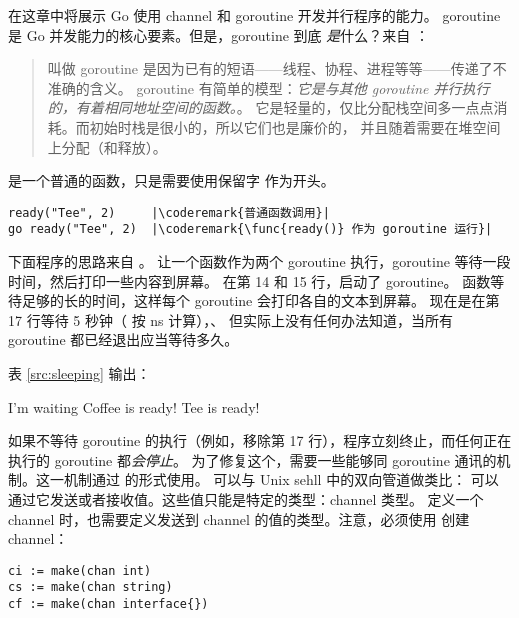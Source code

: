 \noindent{}在这章中将展示 Go 使用 channel 和 goroutine 开发并行程序的能力。
goroutine 是 Go 并发能力的核心要素。但是，goroutine 到底 \emph{是}什么？来自
\cite{effective_go}：
\begin{quote}
叫做 goroutine 是因为已有的短语——线程、协程、进程等等——传递了不准确的含义。
goroutine 有简单的模型：\emph{它是与其他 goroutine 并行执行的，有着相同地址空间的函数。}。
它是轻量的，仅比分配栈空间多一点点消耗。而初始时栈是很小的，所以它们也是廉价的，
并且随着需要在堆空间上分配（和释放）。
\end{quote}
 是一个普通的函数，只是需要使用保留字
 作为开头。
\begin{lstlisting}
ready("Tee", 2)	    |\coderemark{普通函数调用}|
go ready("Tee", 2)  |\coderemark{\func{ready()} 作为 goroutine 运行}|
\end{lstlisting}
下面程序的思路来自 \cite{go_course_day3}。
让一个函数作为两个 goroutine 执行，goroutine 等待一段时间，然后打印一些内容到屏幕。
在第 14 和 15 行，启动了 goroutine。
 函数等待足够的长的时间，这样每个 goroutine 会打印各自的文本到屏幕。
现在是在第 17 行等待 5 秒钟（ 按 ns 计算），、
但实际上没有任何办法知道，当所有 goroutine 都已经退出应当等待多久。 

表 \ref{src:sleeping} 输出：
\begin{display}
I'm waiting         
Coffee is ready!    
Tee is ready!       
\end{display}
如果不等待 goroutine 的执行（例如，移除第 17 行），程序立刻终止，而任何正在执行的 
goroutine 都\emph{会停止}。
为了修复这个，需要一些能够同 goroutine 通讯的机制。这一机制通过  
的形式使用。 可以与 Unix sehll 中的双向管道做类比：
可以通过它发送或者接收值。这些值只能是特定的类型：channel 类型。
定义一个 channel 时，也需要定义发送到 channel 的值的类型。注意，必须使用
 创建 channel：
\begin{lstlisting}
ci := make(chan int)
cs := make(chan string)
cf := make(chan interface{})
\end{lstlisting}
